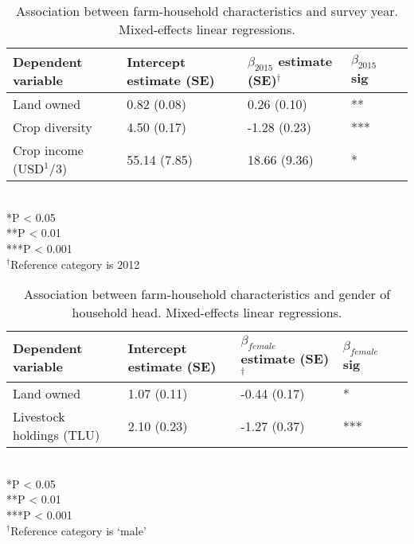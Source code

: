 \begin{table}
  \captionsetup{singlelinecheck = false, justification=justified}
  \caption{
  Association between farm-household characteristics and survey year. Mixed-effects linear regressions.
  }
  \label{tab:A_1}
  \small
\begin{tabular}{L{5cm} C{2.5cm} C{2.5cm} C{2cm} C{2cm}}
\toprule
Dependent variable & Intercept estimate (SE) & $\beta_{2015}$ estimate (SE)$^\dag$ & $\beta_{2015}$ sig \\
\midrule
Land owned & 0.82 (0.08) & 0.26 (0.10) & ** \\
Crop diversity & 4.50 (0.17) & -1.28 (0.23) & *** \\
Crop income (USD$^1/3$) & 55.14 (7.85) & 18.66 (9.36) & * \\
\bottomrule
\end{tabular}
\footnotesize
\raggedright
\\
*P {\textless} 0.05 \\
**P {\textless} 0.01 \\
***P {\textless} 0.001 \\
$^\dag$Reference category is 2012
\end{table}


\begin{table}
  \captionsetup{singlelinecheck = false, justification=justified}
  \caption{
  Association between farm-household characteristics and gender of household head. Mixed-effects linear regressions.
  }
  \label{tab:A_2}
  \small
\begin{tabular}{L{5cm} C{2.5cm} C{2.5cm} C{2cm} C{2cm}}
\toprule
Dependent variable & Intercept estimate (SE) & $\beta_{female}$ estimate (SE)$^\dag$ & $\beta_{female}$ sig \\
\midrule
Land owned & 1.07 (0.11) & -0.44 (0.17) & * \\
Livestock holdings (TLU) & 2.10 (0.23) & -1.27 (0.37) & *** \\
\bottomrule
\end{tabular}
\footnotesize
\raggedright
\\
*P {\textless} 0.05 \\
**P {\textless} 0.01 \\
***P {\textless} 0.001 \\
$^\dag$Reference category is `male'
\end{table}

